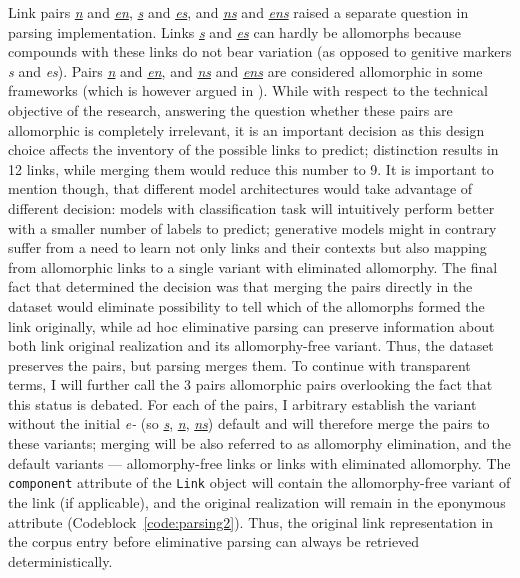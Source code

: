 \documentclass[11pt]{article}
\begin{document}
Link pairs \textit{\underline{n}} and \textit{\underline{en}}, \textit{\underline{s}} and \textit{\underline{es}}, and \textit{\underline{ns}} and \textit{\underline{ens}} raised a separate question in parsing implementation. Links \textit{\underline{s}} and \textit{\underline{es}} can hardly be allomorphs because compounds with these links do not bear variation (as opposed to genitive markers \textit{s} and \textit{es}). Pairs \textit{\underline{n}} and \textit{\underline{en}}, and \textit{\underline{ns}} and \textit{\underline{ens}} are considered allomorphic in some frameworks (which is however argued in \citealt[33-36]{NeefMartin2015}). While with respect to the technical objective of the research, answering the question whether these pairs are allomorphic is completely irrelevant, it is an important decision as this design choice affects the inventory of the possible links to predict; distinction results in 12 links, while merging them would reduce this number to 9. It is important to mention though, that different model architectures would take advantage of different decision: models with classification task will intuitively perform better with a smaller number of labels to predict; generative models might in contrary suffer from a need to learn not only links and their contexts but also mapping from allomorphic links to a single variant with eliminated allomorphy. The final fact that determined the decision was that merging the pairs directly in the dataset would eliminate possibility to tell which of the allomorphs formed the link originally, while ad hoc eliminative parsing can preserve information about both link original realization and its allomorphy-free variant. Thus, the dataset preserves the pairs, but parsing merges them. To continue with transparent terms, I will further call the 3 pairs allomorphic pairs overlooking the fact that this status is debated. For each of the pairs, I arbitrary establish the variant without the initial \textit{e-} (so \textit{\underline{s}}, \textit{\underline{n}}, \textit{\underline{ns}}) default and will therefore merge the pairs to these variants; merging will be also referred to as allomorphy elimination, and the default variants --- allomorphy-free links or links with eliminated allomorphy. The \texttt{component} attribute of the \texttt{Link} object will contain the allomorphy-free variant of the link (if applicable), and the original realization will remain in the eponymous attribute (Codeblock~\ref{code:parsing2}). Thus, the original link representation in the corpus entry before eliminative parsing can always be retrieved deterministically.
\end{document}
